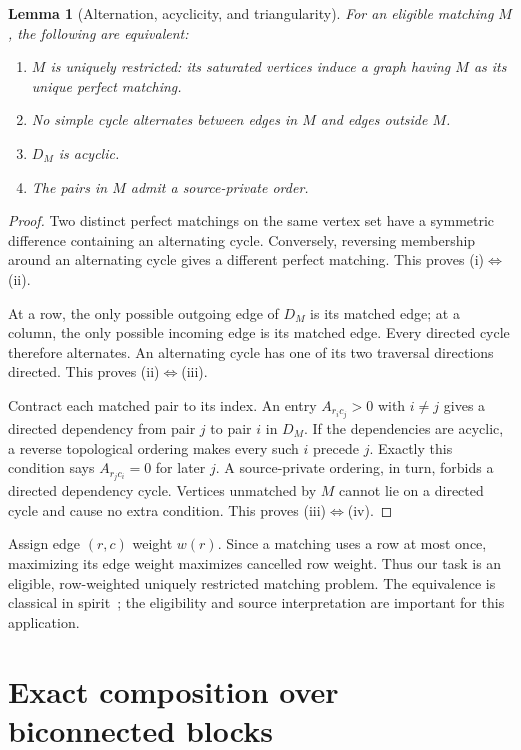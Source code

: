 \documentclass[11pt,letterpaper]{article}
\newtheorem{lemma}[lemma]{Lemma}\aliascntresetthe{lemma}
\theoremstyle{definition}
\theoremstyle{remark}
\begin{document}
\begin{lemma}[Alternation, acyclicity, and triangularity]
\label{lem:matching}
For an eligible matching $M$, the following are equivalent:
\begin{enumerate}[label=(\roman*)]
\item $M$ is uniquely restricted: its saturated vertices induce a graph having $M$ as its unique perfect matching.
\item No simple cycle alternates between edges in $M$ and edges outside $M$.
\item $D_M$ is acyclic.
\item The pairs in $M$ admit a source-private order.
\end{enumerate}
\end{lemma}
\begin{proof}
Two distinct perfect matchings on the same vertex set have a symmetric difference containing an alternating cycle. Conversely, reversing membership around an alternating cycle gives a different perfect matching. This proves (i)$\Leftrightarrow$(ii).

At a row, the only possible outgoing edge of $D_M$ is its matched edge; at a column, the only possible incoming edge is its matched edge. Every directed cycle therefore alternates. An alternating cycle has one of its two traversal directions directed. This proves (ii)$\Leftrightarrow$(iii).

Contract each matched pair to its index. An entry $A_{r_i c_j}>0$ with $i\ne j$ gives a directed dependency from pair $j$ to pair $i$ in $D_M$. If the dependencies are acyclic, a reverse topological ordering makes every such $i$ precede $j$. Exactly this condition says $A_{r_j c_i}=0$ for later $j$. A source-private ordering, in turn, forbids a directed dependency cycle. Vertices unmatched by $M$ cannot lie on a directed cycle and cause no extra condition. This proves (iii)$\Leftrightarrow$(iv).
\end{proof}

Assign edge $(r,c)$ weight $w(r)$. Since a matching uses a row at most once, maximizing its edge weight maximizes cancelled row weight. Thus our task is an eligible, row-weighted uniquely restricted matching problem. The equivalence is classical in spirit~\cite{ghl}; the eligibility and source interpretation are important for this application.

\section{Exact composition over biconnected blocks}
\label{sec:blocks}
\end{document}
